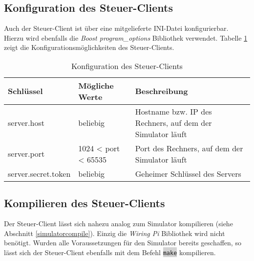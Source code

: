 \subsection{Konfiguration des Steuer-Clients}
Auch der Steuer-Client ist über eine mitgelieferte INI-Datei konfigurierbar. Hierzu wird ebenfalls die \emph{Boost program\_options} Bibliothek verwendet.
Tabelle \ref{tab:clientconfig} zeigt die Konfigurationsmöglichkeiten des Steuer-Clients.

\begin{table}[h]
\centering
\begin{tabularx}{\textwidth}{|p{}|p{}|X|}
\hline
\textbf{Schlüssel} & \textbf{Mögliche Werte} & \textbf{Beschreibung} \\ \hline
server.host & beliebig & Hostname bzw. IP des Rechners, auf dem der Simulator läuft \\ \hline
server.port & 1024 < port < 65535 & Port des Rechners, auf dem der Simulator läuft \\ \hline
server.secret.token & beliebig & Geheimer Schlüssel des Servers \\ \hline
\end{tabularx}
\caption{Konfiguration des Steuer-Clients}
\label{tab:clientconfig}
\end{table}

\subsection{Kompilieren des Steuer-Clients}
Der Steuer-Client lässt sich nahezu analog zum Simulator kompilieren (siehe Abschnitt \ref{simulatorcompile}). Einzig die \emph{Wiring Pi} Bibliothek wird nicht benötigt. Wurden alle Voraussetzungen für den Simulator bereits geschaffen, so lässt sich der Steuer-Client ebenfalls mit dem Befehl \colorbox{lightgrey}{\lstinline[basicstyle=\ttfamily]|make|} kompilieren.